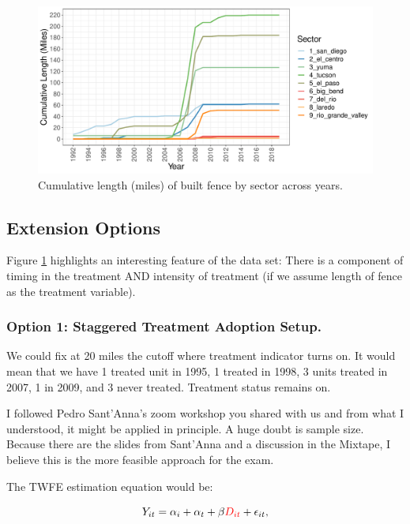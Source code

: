 \documentclass[titlepage]{article}
\begin{document}


\begin{figure}[H]
\centering
    \caption{Cumulative length (miles) of built fence by sector across years.} 
    \label{fig:plot_cum_length} 
    \includegraphics[width=\textwidth]{_images/plot_cum_length.pdf}
\end{figure}

\subsection*{Extension Options}

Figure \ref{fig:plot_cum_length} highlights an interesting feature of the data set: There is a component of timing in the treatment AND intensity of treatment (if we assume length of fence as the treatment variable).

\subsubsection*{Option 1: Staggered Treatment Adoption Setup.}
We could fix at 20 miles the cutoff where treatment indicator turns on. It would mean that we have 1 treated unit in 1995, 1 treated in 1998, 3 units treated in 2007, 1 in 2009, and 3 never treated. Treatment status remains on.

I followed Pedro Sant'Anna's zoom workshop you shared with us and from what I understood, it might be applied in principle. A huge doubt is sample size. Because there are the slides from Sant'Anna and a discussion in the Mixtape, I believe this is the more feasible approach for the exam.

The TWFE estimation equation would be:

\begin{equation}
    Y_{it} = \alpha_{i} + \alpha_{t} + \beta \textcolor{red}{D_{it}} + \epsilon_{it},
\end{equation}
\end{document}
